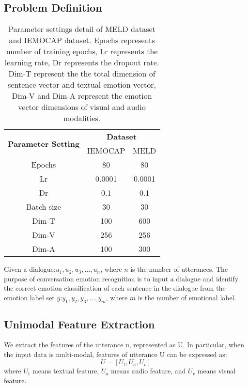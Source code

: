 \subsection{Problem Definition}
\begin{table}[]
	\centering
	\begin{tabular}{c|c|c}
		\hline
		\multirow{2}{*}{\textbf{Parameter   Setting}} & \multicolumn{2}{c}{\textbf{Dataset}} \\ \cline{2-3} 
		& IEMOCAP            & MELD             \\ \hline
		Epochs                                        & 80                 & 80               \\
		Lr                                            & 0.0001             & 0.0001           \\
		Dr                                            & 0.1                & 0.1              \\
		Batch size                                    & 30                 & 30               \\
		Dim-T                                         & 100                & 600              \\
		Dim-V                                         & 256                & 256              \\
		Dim-A                                         & 100                & 300              \\ \hline
	\end{tabular}
	\caption{ Parameter settings detail of MELD dataset and IEMOCAP dataset. Epochs represents number of training epochs, Lr represents the learning rate, Dr represents the dropout rate. Dim-T represent the the total dimension of sentence vector and textual emotion vector, Dim-V and Dim-A represent the emotion vector dimensions of visual and audio modalities.}
\end{table}
Given a dialogue:{$u_1,u_2,u_3,…,u_n$}, where $n$ is the number of utterances. The purpose of conversation emotion recognition is to input a dialogue and identify the correct emotion classification of each sentence in the dialogue from the emotion label set $y$:{$y_1,y_2,y_3,...,y_m$}, where $m$ is the number of emotional label. 
\subsection{Unimodal Feature Extraction}

We extract the features of the utterance u, represented as U. In particular, when the input data is multi-modal, features of utterance U can be expressed as:
\begin{equation}
	U=[U_t,U_a,U_v]
\end{equation}	
where $U_t$ means textual feature, $U_a$ means audio feature, and $U_v$ means visual feature.

